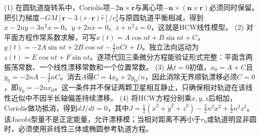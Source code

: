 (1) 在圆轨道旋转系中，Coriolis项\(-2\boldsymbol n\times\dot{\boldsymbol r}\)与离心项\(-\boldsymbol n\times(\boldsymbol n\times\boldsymbol r)\)必须同时保留。把引力梯度\(-GM[\boldsymbol r-3(\hat r\cdot\boldsymbol r)\hat r]/r_0^3\)与原圆轨道平衡相减，得到\(\ddot x-2n\dot y-3n^2x=0\)、\(\ddot y+2n\dot x=0\)、\(\ddot z+n^2z=0\)，这就是HCW线性模型。
(2) 对平面方程作常系数求解，可写\(x(t)=A\cos nt+B\sin nt+C\)，\(y(t)=-2A\sin nt+2B\cos nt-\frac32nCt+D\)。独立法向运动为\(z(t)=E\cos nt+F\sin nt\)。逐项代回三条微分方程能验证形式完整：平面含两振荡常数、一个线性漂移常数和一个位置常数。
(3) 从\(t=0\)初值，\(x_0=A+C\)且\(\dot y_0=-2nA-\frac32nC\)。消去\(A\)得\(C=4x_0+2\dot y_0/n\)，因此消除无界顺轨漂移必须\(C=0\)，即\(\dot y_0=-2nx_0\)。这一条件并不保证两颗卫星相互静止，只确保相对轨迹在该线性近似中不因半长轴偏差持续漂移。
(4) 将HCW方程分别乘\(\dot x,\dot y,\dot z\)后相加，Coriolis做功抵消，得到\(dJ/dt=0\)，其中\(J=\frac12(\dot x^2+\dot y^2+\dot z^2)-\frac32n^2x^2+\frac12n^2z^2\)。该Jacobi型量不是正定能量，允许漂移模；当相对距离不再小于\(r_0\)或轨道明显非圆时，必须使用非线性三体或椭圆参考轨道方程。
